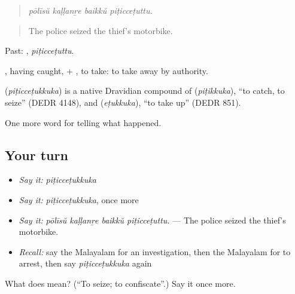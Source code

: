 \begin{quote}
\emph{pōlīsŭ kaḷḷanṟe baikkŭ piṭicceṭuttu.}
\end{quote}

\begin{quote}
The police seized the thief's motorbike.
\end{quote}

Past: , \emph{piṭicceṭuttu}.

, having caught, + , to take: to take away by authority.

\begin{cousinweb}
\textbf{} (\emph{piṭicceṭukkuka}) is a native Dravidian compound of  (\emph{piṭikkuka}), \textquotedblleft{}to catch, to seize\textquotedblright{} (DEDR 4148), and  (\emph{eṭukkuka}), \textquotedblleft{}to take up\textquotedblright{} (DEDR 851).
\end{cousinweb}

\begin{grammarlens}[title={What you've built}]
One more word for telling what happened.
\end{grammarlens}

\subsection*{Your turn}
\begin{itemize}
\raggedright
  \item \emph{Say it:} \emph{piṭicceṭukkuka}
  \item \emph{Say it:} \emph{piṭicceṭukkuka}, once more
  \item \emph{Say it:} \emph{pōlīsŭ kaḷḷanṟe baikkŭ piṭicceṭuttu.} — The police seized the thief's motorbike.
  \item \emph{Recall:} say the Malayalam for an investigation, then the Malayalam for to arrest, then say \emph{piṭicceṭukkuka} again
\end{itemize}

\begin{tcolorbox}[breakable,colback=teal!4,colframe=teal!35!black,title={Before you move on}]
What does  mean? (\textquotedblleft{}To seize; to confiscate\textquotedblright{}.) Say it once more.
\end{tcolorbox}
